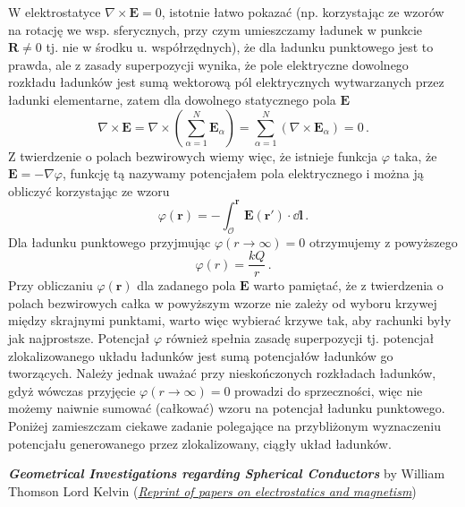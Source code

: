 \documentclass[../main.tex]{subfiles}
\begin{document}
W elektrostatyce \(\nabla\times\mathbf{E}=0\), istotnie łatwo pokazać (np. korzystając ze wzorów na  rotację we wsp. sferycznych, przy czym umieszczamy ładunek w punkcie \(\mathbf{R}\neq 0\) tj. nie w środku u. współrzędnych), że dla ładunku punktowego jest to prawda, ale z zasady superpozycji wynika, że pole elektryczne dowolnego rozkładu ładunków jest sumą wektorową pól elektrycznych wytwarzanych przez ładunki elementarne, zatem dla dowolnego statycznego pola \(\mathbf{E}\)
\begin{equation*}
    \nabla\times\mathbf{E}=\nabla\times\left(\sum_{\alpha=1}^N\mathbf{E}_\alpha\right)=\sum_{\alpha=1}^N(\nabla\times\mathbf{E}_\alpha)=0\,.
\end{equation*}
Z twierdzenie o polach bezwirowych wiemy więc, że istnieje funkcja \(\varphi\) taka, że \(\mathbf{E}=-\nabla\varphi\), funkcję tą nazywamy potencjałem pola elektrycznego i można ją obliczyć korzystając ze wzoru
\begin{equation*}
    \varphi(\mathbf{r})=-\int_\mathcal{O}^\mathbf{r}\mathbf{E}(\mathbf{r}')\cdot\dd\mathbf{l\,.}
\end{equation*}
Dla ładunku punktowego przyjmując \(\varphi(r\to\infty)=0\) otrzymujemy z powyższego
\begin{equation*}
    \varphi(r)=\frac{kQ}{r}\,.
\end{equation*}
Przy obliczaniu \(\varphi(\mathbf{r})\) dla zadanego pola \(\mathbf{E}\) warto pamiętać, że z twierdzenia o polach bezwirowych całka w powyższym wzorze nie zależy od wyboru krzywej między skrajnymi punktami, warto więc wybierać krzywe tak, aby rachunki były jak najprostsze. Potencjał \(\varphi\) również spełnia zasadę superpozycji tj. potencjał zlokalizowanego układu ładunków jest sumą potencjałów ładunków go tworzących. Należy jednak uważać przy nieskończonych rozkładach ładunków, gdyż wówczas przyjęcie \(\varphi(r\to\infty)=0\) prowadzi do sprzeczności, więc nie możemy naiwnie sumować (całkować) wzoru na potencjał ładunku punktowego. Poniżej zamieszczam ciekawe zadanie polegające na przybliżonym wyznaczeniu potencjału generowanego przez zlokalizowany, ciągły układ ładunków.
\medskip

\textit{\textbf{Geometrical Investigations regarding Spherical Conductors}} by William Thomson Lord Kelvin (\href{https://archive.org/details/reprintofpaperso00kelv/page/56/mode/2up?view=theater}{\textit{Reprint of papers on electrostatics and magnetism}})
\end{document}
